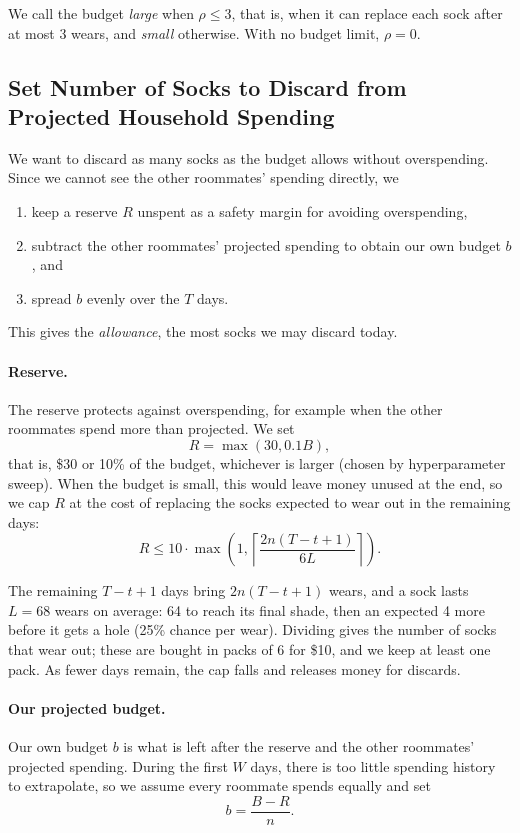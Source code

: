 \documentclass[11pt]{article}
\begin{document}
We call the budget \emph{large} when \(\rho \le 3\), that is, when it can replace each sock after at most 3 wears, and \emph{small} otherwise. With no budget limit, \(\rho=0\).

\subsection{Set Number of Socks to Discard from Projected Household Spending}
\label{sec:discard-number}

We want to discard as many socks as the budget allows without overspending. Since we cannot see the other roommates' spending directly, we
\begin{enumerate}
    \item keep a reserve \(R\) unspent as a safety margin for avoiding overspending,
    \item subtract the other roommates' projected spending to obtain our own budget \(b\), and
    \item spread \(b\) evenly over the \(T\) days.
\end{enumerate}
This gives the \emph{allowance}, the most socks we may discard today.

\paragraph{Reserve.}
The reserve protects against overspending, for example when the other roommates spend more than projected. We set
\[
R=\max(30,0.1B),
\]
that is, \$30 or 10\% of the budget, whichever is larger (chosen by hyperparameter sweep). When the budget is small, this would leave money unused at the end, so we cap \(R\) at the cost of replacing the socks expected to wear out in the remaining days:
\[
R
\le
10\cdot
\max\left(
1,
\left\lceil
\frac{2n(T-t+1)}{6L}
\right\rceil
\right).
\]

The remaining \(T-t+1\) days bring \(2n(T-t+1)\) wears, and a sock lasts \(L=68\) wears on average: 64 to reach its final shade, then an expected 4 more before it gets a hole (25\% chance per wear). Dividing gives the number of socks that wear out; these are bought in packs of 6 for \$10, and we keep at least one pack. As fewer days remain, the cap falls and releases money for discards.

\paragraph{Our projected budget.}
Our own budget \(b\) is what is left after the reserve and the other roommates' projected spending. During the first \(W\) days, there is too little spending history to extrapolate, so we assume every roommate spends equally and set
\[
b=\frac{B-R}{n}.
\]
\end{document}
